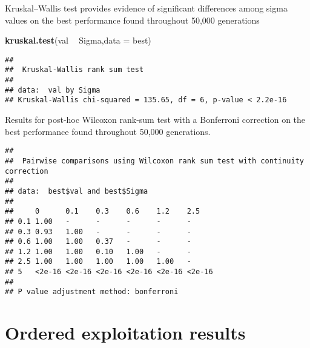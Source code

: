 \documentclass[]{book}
\newenvironment{Shaded}{\begin{snugshade}}{\end{snugshade}}
\newcommand{\DataTypeTok}[1]{\textcolor[rgb]{0.13,0.29,0.53}{#1}}
\newcommand{\KeywordTok}[1]{\textcolor[rgb]{0.13,0.29,0.53}{\textbf{#1}}}
\newcommand{\NormalTok}[1]{#1}
\newcommand{\OperatorTok}[1]{\textcolor[rgb]{0.81,0.36,0.00}{\textbf{#1}}}
\newcommand{\OtherTok}[1]{\textcolor[rgb]{0.56,0.35,0.01}{#1}}
\newcommand{\StringTok}[1]{\textcolor[rgb]{0.31,0.60,0.02}{#1}}
\begin{document}
Kruskal--Wallis test provides evidence of significant differences among sigma values on the best performance found throughout 50,000 generations

\begin{Shaded}
\begin{Highlighting}[]
\KeywordTok{kruskal.test}\NormalTok{(val }\OperatorTok{~}\StringTok{ }\NormalTok{Sigma,}\DataTypeTok{data =}\NormalTok{ best)}
\end{Highlighting}
\end{Shaded}

\begin{verbatim}
## 
##  Kruskal-Wallis rank sum test
## 
## data:  val by Sigma
## Kruskal-Wallis chi-squared = 135.65, df = 6, p-value < 2.2e-16
\end{verbatim}

Results for post-hoc Wilcoxon rank-sum test with a Bonferroni correction on the best performance found throughout 50,000 generations.

\begin{Shaded}
\end{Shaded}

\begin{verbatim}
## 
##  Pairwise comparisons using Wilcoxon rank sum test with continuity correction 
## 
## data:  best$val and best$Sigma 
## 
##     0      0.1    0.3    0.6    1.2    2.5   
## 0.1 1.00   -      -      -      -      -     
## 0.3 0.93   1.00   -      -      -      -     
## 0.6 1.00   1.00   0.37   -      -      -     
## 1.2 1.00   1.00   0.10   1.00   -      -     
## 2.5 1.00   1.00   1.00   1.00   1.00   -     
## 5   <2e-16 <2e-16 <2e-16 <2e-16 <2e-16 <2e-16
## 
## P value adjustment method: bonferroni
\end{verbatim}

\hypertarget{ordered-exploitation-results-5}{%
\section{Ordered exploitation results}\label{ordered-exploitation-results-5}}
\end{document}
